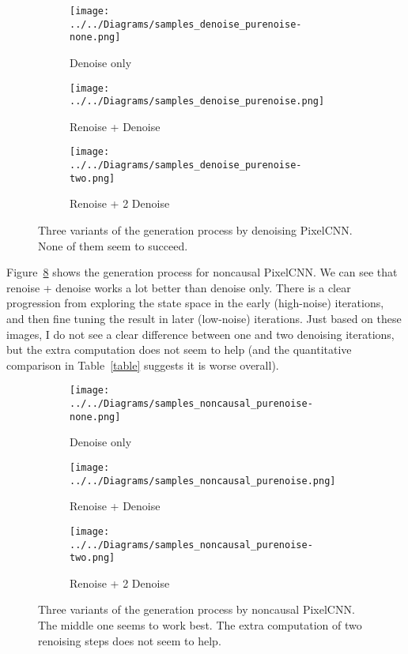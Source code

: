 \documentclass[11pt, a4paper, openany]{book}
\begin{document}
\begin{figure}
  \centering    
    \begin{subfigure}{0.32\columnwidth}
        \centering
        \caption{Denoise only}
        \texttt{[image: ../../Diagrams/samples\_denoise\_purenoise-none.png]} 
        \label{denoisesamples:none}
    \end{subfigure}
    \hfill
    \begin{subfigure}{0.32\columnwidth}
        \centering
        \caption{Renoise + Denoise}
        \texttt{[image: ../../Diagrams/samples\_denoise\_purenoise.png]} 
        \label{denoisesamples:renoise}
    \end{subfigure}
    \hfill
    \begin{subfigure}{0.32\columnwidth}
        \centering
        \caption{Renoise + 2 Denoise}
        \texttt{[image: ../../Diagrams/samples\_denoise\_purenoise-two.png]} 
        \label{denoisesamples:two}
    \end{subfigure}
  \caption[Generation process by denoising PixelCNN]{Three variants of the generation process by denoising PixelCNN. None of them seem to succeed.}
  \label{denoisesamples}
\end{figure}

Figure~\ref{noncausalsamples} shows the generation process for noncausal PixelCNN. We can see that renoise + denoise works a lot better than denoise only. There is a clear progression from exploring the state space in the early (high-noise) iterations, and then fine tuning the result in later (low-noise) iterations. Just based on these images, I do not see a clear difference between one and two denoising iterations, but the extra computation does not seem to help (and the quantitative comparison in Table~\ref{table} suggests it is worse overall).

\begin{figure}
  \centering    
    \begin{subfigure}{0.32\columnwidth}
        \centering
        \caption{Denoise only}
        \texttt{[image: ../../Diagrams/samples\_noncausal\_purenoise-none.png]} 
        \label{noncausalsamples:none}
    \end{subfigure}
    \hfill
    \begin{subfigure}{0.32\columnwidth}
        \centering
        \caption{Renoise + Denoise}
        \texttt{[image: ../../Diagrams/samples\_noncausal\_purenoise.png]} 
        \label{noncausalsamples:renoise}
    \end{subfigure}
    \hfill
    \begin{subfigure}{0.32\columnwidth}
        \centering
        \caption{Renoise + 2 Denoise}
        \texttt{[image: ../../Diagrams/samples\_noncausal\_purenoise-two.png]} 
        \label{noncausalsamples:two}
    \end{subfigure}
  \caption[Generation process by noncausal PixelCNN]{Three variants of the generation process by noncausal PixelCNN. The middle one seems to work best. The extra computation of two renoising steps does not seem to help.}
  \label{noncausalsamples}
\end{figure}
\end{document}
